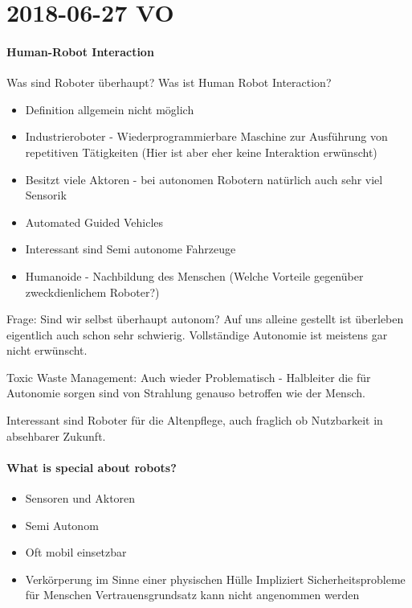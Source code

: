 \section{2018-06-27 VO}
\paragraph{Human-Robot Interaction}

Was sind Roboter überhaupt? Was ist Human Robot Interaction? 

\begin{itemize}
\item Definition allgemein nicht möglich
\item Industrieroboter - Wiederprogrammierbare Maschine zur Ausführung von repetitiven
Tätigkeiten (Hier ist aber eher keine Interaktion erwünscht)
\item  Besitzt viele Aktoren - bei autonomen Robotern natürlich auch sehr viel Sensorik
\item Automated Guided Vehicles
\item Interessant sind Semi autonome Fahrzeuge
\item Humanoide - Nachbildung des Menschen (Welche Vorteile gegenüber zweckdienlichem
Roboter?)
\end{itemize}

Frage: Sind wir selbst überhaupt autonom? Auf uns alleine gestellt ist überleben
eigentlich auch schon sehr schwierig. Vollständige Autonomie ist meistens gar
nicht erwünscht.

Toxic Waste Management: Auch wieder Problematisch - Halbleiter die für Autonomie sorgen
sind von Strahlung genauso betroffen wie der Mensch.

Interessant sind Roboter für die Altenpflege, auch fraglich ob Nutzbarkeit in absehbarer
Zukunft.

\paragraph{What is special about robots?}


\begin{itemize}
\item Sensoren und Aktoren
\item Semi Autonom
\item Oft mobil einsetzbar
\item Verkörperung im Sinne einer physischen Hülle
	\subitem Impliziert Sicherheitsprobleme für Menschen
	\subitem Vertrauensgrundsatz kann nicht angenommen werden
\end{itemize}

